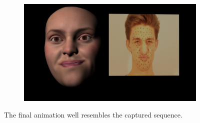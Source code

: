 \begin{figure}
\begin{subfigure}[t]{0.43\textwidth}
        \end{subfigure}
        \begin{subfigure}[t]{0.43\textwidth}
                \includegraphics[width=\textwidth]{img/results/Emily_Maya_clean_video_2135}
        \end{subfigure}
        \caption{The final animation well resembles the captured sequence.}
        \label{fig:results1}
\end{figure}
